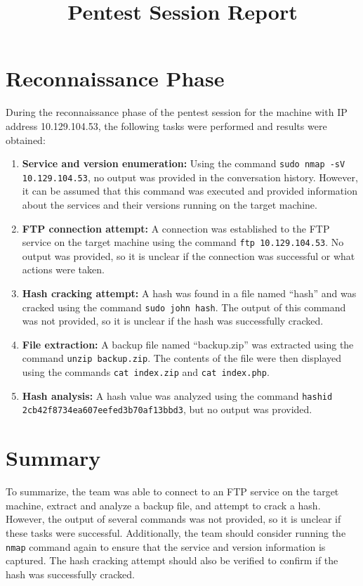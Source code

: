 \documentclass{article}
\title{Pentest Session Report}
\author{}
\date{}
\begin{document}
\maketitle

\section{Reconnaissance Phase}

During the reconnaissance phase of the pentest session for the machine with IP address 10.129.104.53, the following tasks were performed and results were obtained:

\begin{enumerate}
    \item \textbf{Service and version enumeration:} Using the command \texttt{sudo nmap -sV 10.129.104.53}, no output was provided in the conversation history. However, it can be assumed that this command was executed and provided information about the services and their versions running on the target machine.
    \item \textbf{FTP connection attempt:} A connection was established to the FTP service on the target machine using the command \texttt{ftp 10.129.104.53}. No output was provided, so it is unclear if the connection was successful or what actions were taken.
    \item \textbf{Hash cracking attempt:} A hash was found in a file named ``hash'' and was cracked using the command \texttt{sudo john hash}. The output of this command was not provided, so it is unclear if the hash was successfully cracked.
    \item \textbf{File extraction:} A backup file named ``backup.zip'' was extracted using the command \texttt{unzip backup.zip}. The contents of the file were then displayed using the commands \texttt{cat index.zip} and \texttt{cat index.php}.
    \item \textbf{Hash analysis:} A hash value was analyzed using the command \texttt{hashid 2cb42f8734ea607eefed3b70af13bbd3}, but no output was provided.
\end{enumerate}

\section{Summary}

To summarize, the team was able to connect to an FTP service on the target machine, extract and analyze a backup file, and attempt to crack a hash. However, the output of several commands was not provided, so it is unclear if these tasks were successful. Additionally, the team should consider running the \texttt{nmap} command again to ensure that the service and version information is captured. The hash cracking attempt should also be verified to confirm if the hash was successfully cracked.
\end{document}

